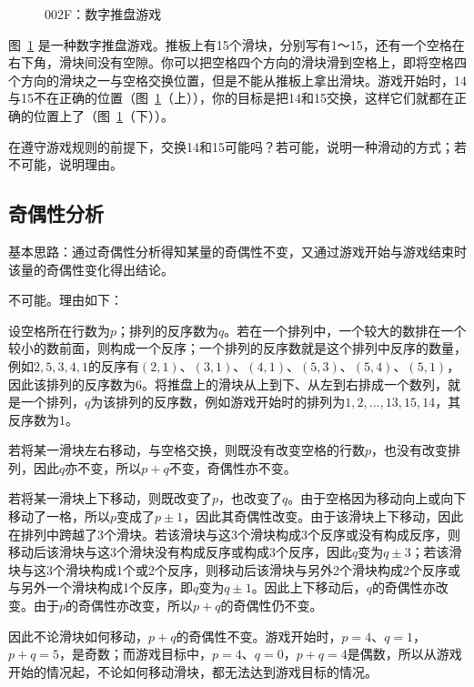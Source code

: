 

\begin{figure}[htbp]
  \centering
  \caption{002F：数字推盘游戏} \label{fig:002F}
\end{figure}

图~\ref{fig:002F} 是一种数字推盘游戏。推板上有15个滑块，分别写有1～15，还有一个空格在右下角，滑块间没有空隙。你可以把空格四个方向的滑块滑到空格上，即将空格四个方向的滑块之一与空格交换位置，但是不能从推板上拿出滑块。游戏开始时，14与15不在正确的位置（图~\ref{fig:002F}（上）），你的目标是把14和15交换，这样它们就都在正确的位置上了（图~\ref{fig:002F}（下））。

在遵守游戏规则的前提下，交换14和15可能吗？若可能，说明一种滑动的方式；若不可能，说明理由。


\subsection{奇偶性分析}

基本思路：通过奇偶性分析得知某量的奇偶性不变，又通过游戏开始与游戏结束时该量的奇偶性变化得出结论。

不可能。理由如下：

设空格所在行数为$p$；排列的反序数为$q$。若在一个排列中，一个较大的数排在一个较小的数前面，则构成一个反序；一个排列的反序数就是这个排列中反序的数量，例如$2,5,3,4,1$的反序有$(2,1)$、$(3,1)$、$(4,1)$、$(5,3)$、$(5,4)$、$(5,1)$，因此该排列的反序数为6。将推盘上的滑块从上到下、从左到右排成一个数列，就是一个排列，$q$为该排列的反序数，例如游戏开始时的排列为$1,2,\dots,13,15,14$，其反序数为1。

若将某一滑块左右移动，与空格交换，则既没有改变空格的行数$p$，也没有改变排列，因此$q$亦不变，所以$p + q$不变，奇偶性亦不变。

若将某一滑块上下移动，则既改变了$p$，也改变了$q$。由于空格因为移动向上或向下移动了一格，所以$p$变成了$p \pm1$，因此其奇偶性改变。由于该滑块上下移动，因此在排列中跨越了3个滑块。若该滑块与这3个滑块构成3个反序或没有构成反序，则移动后该滑块与这3个滑块没有构成反序或构成3个反序，因此$q$变为$q \pm3$；若该滑块与这3个滑块构成1个或2个反序，则移动后该滑块与另外2个滑块构成2个反序或与另外一个滑块构成1个反序，即$q$变为$q \pm1$。因此上下移动后，$q$的奇偶性亦改变。由于$p$的奇偶性亦改变，所以$p + q$的奇偶性仍不变。

因此不论滑块如何移动，$p + q$的奇偶性不变。游戏开始时，$p = 4$、$q = 1$，$p + q = 5$，是奇数；而游戏目标中，$p = 4$、$q = 0$，$p + q = 4$是偶数，所以从游戏开始的情况起，不论如何移动滑块，都无法达到游戏目标的情况。
